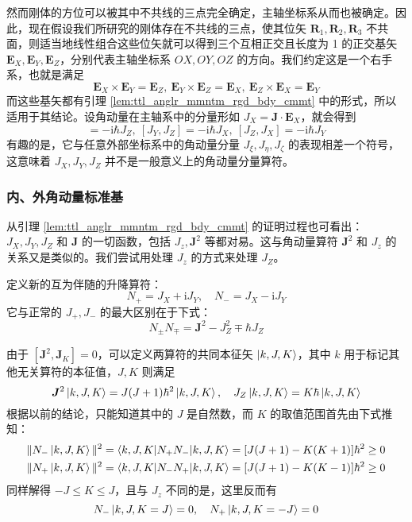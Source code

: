 \documentclass[cn,10pt,math=newtx,citestyle=gb7714-2015,bibstyle=gb7714-2015]{elegantbook}
\def\bm{\boldsymbol}
\def\i{\mathrm i}
\begin{document}
然而刚体的方位可以被其中不共线的三点完全确定，主轴坐标系从而也被确定。因此，现在假设我们所研究的刚体存在不共线的三点，使其位矢 $\bm R_1,\bm R_2,\bm R_3$ 不共面，则适当地线性组合这些位矢就可以得到三个互相正交且长度为 1 的正交基矢 $\bm E_X,\bm E_Y,\bm E_Z$，分别代表主轴坐标系 $OX,OY,OZ$ 的方向。我们约定这是一个右手系，也就是满足
\begin{equation}
    \bm E_X\times\bm E_Y = \bm E_Z,\ \bm E_Y\times\bm E_Z =\bm E_X,\ \bm E_Z\times\bm E_X = \bm E_Y
\end{equation}
而这些基矢都有引理 \ref{lem:ttl_anglr_mmntm_rgd_bdy_cmmt} 中的形式，所以适用于其结论。设角动量在主轴系中的分量形如 $J_X = \bm J\cdot\bm E_X$，就会得到
\begin{equation}
    [J_X,J_Y] = -\i\hbar J_Z,\ [J_Y,J_Z] = -\i\hbar J_X,\ [J_Z,J_X] = -\i\hbar J_Y
\end{equation}
有趣的是，它与任意外部坐标系中的角动量分量 $J_\xi,J_\eta,J_\zeta$ 的表现相差一个符号，这意味着 $J_X,J_Y,J_Z$ 并不是一般意义上的角动量分量算符。

\subsubsection{内、外角动量标准基}

从引理 \ref{lem:ttl_anglr_mmntm_rgd_bdy_cmmt} 的证明过程也可看出：$J_X,J_Y,J_Z$ 和 $\bm J$ 的一切函数，包括 $J_z,\bm J^2$ 等都对易。这与角动量算符 $\bm J^2$ 和 $J_z$ 的关系又是类似的。我们尝试用处理 $J_z$ 的方式来处理 $J_Z$。

定义新的互为伴随的升降算符：
\begin{equation}
    N_+ = J_X+\i J_Y,\quad N_- = J_X-\i J_Y
\end{equation}
它与正常的 $J_+,J_-$ 的最大区别在于下式：
\begin{equation}
    N_\pm N_\mp = \bm J^2-J_Z^2\mp\hbar J_Z
\end{equation}

由于 $[\bm J^2,\bm J_K]=0$，可以定义两算符的共同本征矢 $\ket{k,J,K}$，其中 $k$ 用于标记其他无关算符的本征值，$J,K$ 则满足
\begin{equation}
    \bm J^2\ket{k,J,K} = J(J+1)\hbar^2\ket{k,J,K},\quad J_Z\ket{k,J,K} = K\hbar\ket{k,J,K}
\end{equation}
根据以前的结论，只能知道其中的 $J$ 是自然数，而 $K$ 的取值范围首先由下式推知：
\begin{align}
    \|N_-\ket{k,J,K}\|^2 &=\braket{k,J,K|N_+N_-|k,J,K} = [J(J+1)-K(K+1)]\hbar^2 \ge 0\\
    \|N_+\ket{k,J,K}\|^2 &=\braket{k,J,K|N_-N_+|k,J,K} = [J(J+1)-K(K-1)]\hbar^2 \ge 0
\end{align}
同样解得 $-J\le K\le J$，且与 $J_z$ 不同的是，这里反而有
\begin{equation}
    N_-\ket{k,J,K=J} = 0,\quad N_+\ket{k,J,K=-J} = 0
\end{equation}
\end{document}
